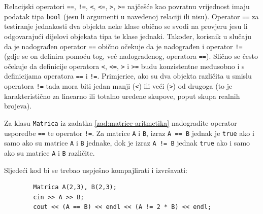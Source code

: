 Relacijski operatori \texttt{==}, \texttt{!=},
\texttt{<}, \texttt{<=}, \texttt{>}, \texttt{>=}
najčešće kao povratnu vrijednost imaju podatak tipa \texttt{bool}
(jesu li argumenti u navedenoj relaciji ili nisu).
Operator \texttt{==} za testiranje jednakosti dva objekta neke klase 
obično se svodi na
provjeru jesu li odgovarajući dijelovi objekata tipa te klase jednaki.
Također, korisnik u slučaju da je nadograđen operator \texttt{==}
obično očekuje da je nadograđen i operator \texttt{!=}
(gdje se on definira pomoću tog, već nadograđenog, operatora \texttt{==}).
Slično se često očekuje da definicije operatora 
\texttt{<}, \texttt{<=}, \texttt{>} i \texttt{>=}
budu konzistentne međusobno i s definicijama operatora \texttt{==} i \texttt{!=}.
Primjerice, ako su dva objekta različita u smislu operatora \texttt{!=}
tada mora biti jedan manji (\texttt{<}) ili veći (\texttt{>}) od drugoga
(to je karakteristično za linearno ili totalno uređene skupove,
poput skupa realnih brojeva).


\begin{zadatak}\label{zad:matrice-usporedba}
    Za klasu \texttt{Matrica} iz zadatka \ref{zad:matrice-aritmetika}
    nadogradite operator usporedbe \texttt{==}
    te operator \texttt{!=}.
    Za matrice \texttt{A} i \texttt{B},
    izraz \texttt{A == B} jednak je \texttt{true} ako i samo ako su matrice \texttt{A} i \texttt{B} jednake,
    dok je izraz \texttt{A != B} jednak \texttt{true} ako i samo ako su matrice \texttt{A} i \texttt{B} različite.

     Sljedeći kod bi se trebao uspješno kompajlirati i izvršavati:
    \begin{verbatim}
        Matrica A(2,3), B(2,3);
        cin >> A >> B;
        cout << (A == B) << endl << (A != 2 * B) << endl;
    \end{verbatim}
\end{zadatak}


